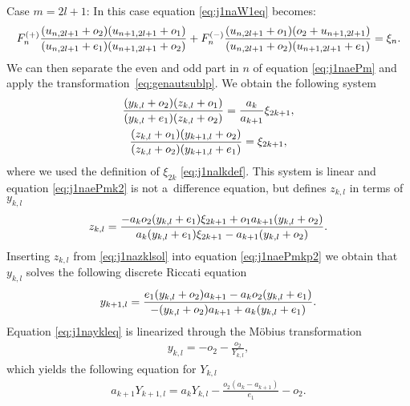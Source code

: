 \documentclass[pdftex]{sigma}
\numberwithin{equation}{section}
\begin{document}
Case $m=2l+1$: In this case equation \eqref{eq:j1naW1eq} becomes:
 \begin{gather}
F_n^{(+)} {\frac { ( u_{{n,2l+1}}+o_2 )
 ( u_{{n+1,2l+1}}+o_1 ) }{ ( u_{{n,2l+1}}+e_1 )
 ( u_{{n+1,2l+1}} +o_{2}) }}
 +F_n^{(-)} {\frac { ( u_{{n,2l+1}}+o_1 )
 ( o_2+u_{{n+1,2l+1}} ) }{%
 ( u_{{n,2l+1}}+ o_2 ) ( u_{{n+1,2l+1}}+e_1 ) }}=\xi_{n}. \label{eq:j1naePm}
 \end{gather}
 We can then separate the even and odd part in
 $n$ of equation \eqref{eq:j1naePm} and apply the
 transformation~\eqref{eq:genautsublp}.
 We obtain the following system
 \begin{subequations} \label{eq:j1naePmsys}
 \begin{gather}
 {\frac { ( y_{{k,l}}+{ o_2} )
 ( z_{{k,l}}+{ o_1} ) }{
 ( y_{{k,l}}+{ e_1} )
 ( z_{{k,l}}+{ o_2} ) }}
 ={\frac {a_{{k}}}{a_{{k+1}}}}\xi_{{2 k+1}}, \label{eq:j1naePmk2}
 \\
 {\frac { ( z_{{k,l}}+{ o_1} )
 ( y_{{k+1,l}}+{ o_2} ) }{%
 ( z_{{k,l}}+{ o_2} )
 ( y_{{k+1,l}}+{ e_1} ) }} =\xi_{{2 k+1}},
 \label{eq:j1naePmkp2}
 \end{gather}
 \end{subequations}
where we used the def\/inition of $\xi_{2k}$ \eqref{eq:j1nalkdef}. This system is linear and equation \eqref{eq:j1naePmk2}
 is not a~dif\/ference equation, but def\/ines $z_{k,l}$ in terms of $y_{k,l}$
 \begin{gather}
 z_{{k,l}}={\frac {-a_{{k}}{ o_2} ( y_{{k,l}}+{ e_1} )
 \xi_{{2 k+1}}+{ o_1} a_{{k+1}} ( y_{{k,l}}+{ o_2} ) }{%
 a_{{k}} ( y_{{k,l}}+{ e_1} ) \xi_{{2 k+1}}
 -a_{{k+1}} ( y_{{k,l}}+{ o_2} ) }}.
 \label{eq:j1nazklsol}
 \end{gather}
 Inserting $z_{k,l}$ from \eqref{eq:j1nazklsol} into
 equation \eqref{eq:j1naePmkp2} we obtain that
 $y_{k,l}$ solves the following discrete Riccati
 equation
 \begin{gather}
 y_{{k+1,l}}=
 {\frac {{ e_1} ( y_{{k,l}}+ { o_2}) a_{{k+1}}
 -a_{{k}}{ o_2} ( y_{{k,l}}+{ e_1} ) }{%
 -( y_{{k,l}}+{ o_2} ) a_{{k+1}}
 +a_{{k}} ( y_{{k,l}}+{ e_1} ) }}.
 \label{eq:j1naykleq}
 \end{gather}
 Equation \eqref{eq:j1naykleq} is linearized through the M\"obius transformation
 \begin{gather}
 y_{{k,l}}=-{ o_2}-{\frac {{ o_2}}{Y_{{k,l}}}}, \label{eq:j1naYkldef}
 \end{gather}
 which yields the following equation for $Y_{k,l}$
 \begin{gather}
 a_{{k+1}}Y_{{k+1,l}}=a_{{k}}Y_{{k,l}} -{\frac {{ o_2} ( a_{{k}}-a_{{k+1}} ) }{{ e_1}}-{ o_2}}. \label{eq:j1naYkleq}
 \end{gather}
\end{document}
